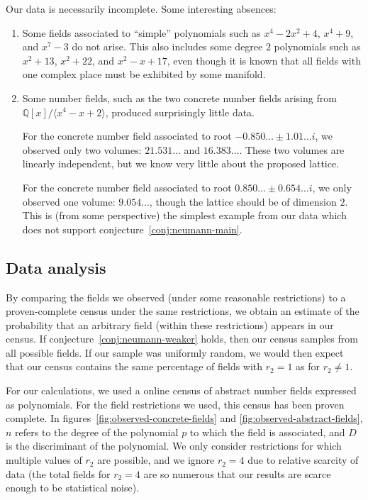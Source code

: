 \documentclass[10pt]{amsart}
\numberwithin{equation}{theorem}
\theoremstyle{definition}
\begin{document}
Our data is necessarily incomplete.  Some interesting absences:

\begin{enumerate}

\item Some fields associated to ``simple'' polynomials such as $x^4 -
2x^2 + 4$, $x^4 + 9$, and $x^7 - 3$ do not arise.  This also includes
some degree $2$ polynomials such as $x^2 + 13$, $x^2 + 22$, and $x^2 -
x + 17$, even though it is known that all fields with one complex place
must be exhibited by some manifold.

\item Some number fields, such as the two concrete number fields
arising from $\mathbb{Q}[x]/\langle x^4 - x + 2 \rangle$, produced
surprisingly little data.

For the concrete number field associated to root $-0.850\dotsc \pm
1.01\dotsc i$, we observed only two volumes: $21.531\dotsc$ and
$16.383\dotsc$. These two volumes are linearly independent, but we know
very little about the proposed lattice.

For the concrete number field associated to root $0.850\dotsc
\pm 0.654\dotsc i$, we only observed one volume: $9.054\dotsc$,
though the lattice should be of dimension $2$. This is (from some
perspective) the simplest example from our data which does not support
conjecture~\ref{conj:neumann-main}.

\end{enumerate}

\subsection{Data analysis}

By comparing the fields we observed (under some reasonable restrictions) to a
proven-complete census under the same restrictions, we obtain an estimate
of the probability that an arbitrary field (within these restrictions)
appears in our census. If conjecture~\ref{conj:neumann-weaker} holds,
then our census samples from all possible fields. If our sample was
uniformly random, we would then expect that our census contains the same
percentage of fields with $r_2 = 1$ as for $r_2 \ne 1$.

For our calculations, we used a online census \parencite{jones2014}
of abstract number fields expressed as polynomials. For
the field restrictions we used, this census has been proven
complete. In figures~\ref{fig:observed-concrete-fields} and
\ref{fig:observed-abstract-fields}, $n$ refers to the degree of
the polynomial $p$ to which the field is associated, and $D$ is the
discriminant of the polynomial. We only consider restrictions for which
multiple values of $r_2$ are possible, and we ignore $r_2 = 4$ due to
relative scarcity of data (the total fields for $r_2 = 4$ are so numerous
that our results are scarce enough to be statistical noise).
\end{document}
